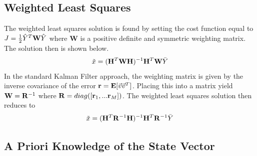 \documentclass{article}
\begin{document}
\subsection{Weighted Least Squares}

The weighted least squares solution is found by setting the cost
function equal to $J = \frac{1}{2}\hat{Y}^T{\bf W}\hat{Y}$
where {\bf W} is a positive definite and symmetric weighting matrix. The solution then is
shown below.
\begin{equation}\label{e:weights}
  \tilde{x} = ({\bf H}^T{\bf W}{\bf H})^{-1}{\bf H}^T{\bf W}\bar{Y}
\end{equation}
In the standard Kalman Filter approach, the weighting matrix is given
by the inverse covariance of the error ${\bf r} = {\bf
  E}[\vec{v}\vec{v}^T]$. Placing this into a matrix yield ${\bf W} =
{\bf R}^{-1}$ where ${\bf R} = diag([{\bf r}_1,...{\bf r}_M])$.  
The weighted least squares solution then reduces to
\begin{equation}
  \tilde{x} = ({\bf H}^T{\bf R}^{-1}{\bf H})^{-1}{\bf H}^T{\bf R}^{-1}\bar{Y}
\end{equation}

\subsection{A Priori Knowledge of the State Vector}
\end{document}
